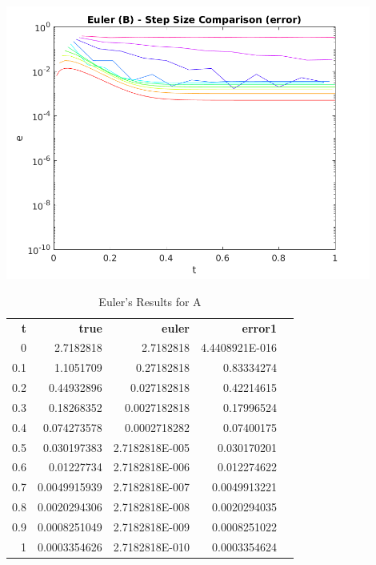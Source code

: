 \documentclass{article}
\begin{document}
\begin{center}
  \includegraphics[width=0.9\textwidth]{../output/b_euler_h_err.png}
  \label{fig:b_euler_h_err}
\end{center}

\begin{table}
\footnotesize
\centering
\caption{Euler's Results for A}
\label{tab:a_euler}
\begin{tabular}{rrrrl}
\textbf{t} & \textbf{true} & \textbf{euler} & \textbf{error1} &  \\
0          & 2.7182818     & 2.7182818      & 4.4408921E-016  &  \\
0.1        & 1.1051709     & 0.27182818     & 0.83334274      &  \\
0.2        & 0.44932896    & 0.027182818    & 0.42214615      &  \\
0.3        & 0.18268352    & 0.0027182818   & 0.17996524      &  \\
0.4        & 0.074273578   & 0.0002718282   & 0.07400175      &  \\
0.5        & 0.030197383   & 2.7182818E-005 & 0.030170201     &  \\
0.6        & 0.01227734    & 2.7182818E-006 & 0.012274622     &  \\
0.7        & 0.0049915939  & 2.7182818E-007 & 0.0049913221    &  \\
0.8        & 0.0020294306  & 2.7182818E-008 & 0.0020294035    &  \\
0.9        & 0.0008251049  & 2.7182818E-009 & 0.0008251022    &  \\
1          & 0.0003354626  & 2.7182818E-010 & 0.0003354624    
\end{tabular}
\end{table}
\end{document}

